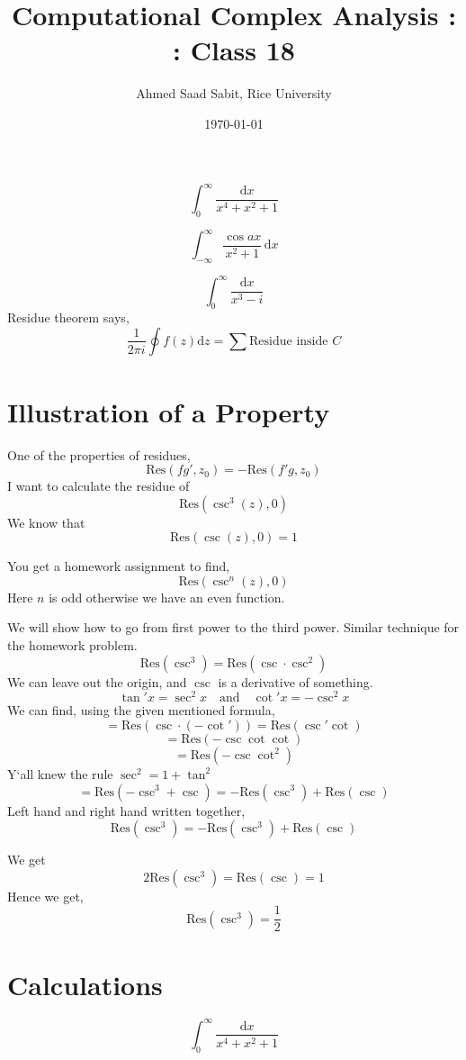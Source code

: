 \documentclass[letter]{article}
\title{Computational Complex Analysis : : Class 18}
\author{Ahmed Saad Sabit, Rice University}
\date{\today}
\begin{document}
\maketitle
\[
\int_0^{\infty} \frac{\mathrm{d} x}{x^{4}+x^2+1}
\] 

\[
	\int_{-\infty}^{\infty} \frac{\cos a x}{x^2 + 1} \, \mathrm{d} x
\]

\[
\int_0^{\infty} \frac{\mathrm{d} x}{x^3 - i }
\] 
Residue theorem says, 
\[
\frac{1}{2 \pi i} \oint f(z) \mathrm{d} z = 
\sum_{}^{} \text{Residue inside } C
\] 

\section*{Illustration of a Property} 
One of the properties of residues,
\[
\text{Res}\left(fg' , z_0\right) = - \text{Res}(f'g, z_0)
\] 
I want to calculate the residue of 
\[
\text{Res} \left(\csc^3(z) , 0\right)
\]
We know that 
\[
\text{Res}\left(\csc (z) , 0 \right) = 1
\]

You get a homework assignment to find, 
\[
\text{Res} \left(\csc^{n}(z) , 0\right)
\] Here $n$ is odd otherwise we have an even function.

We will show how to go from first power to the third power. Similar technique for the homework problem. 
\[
\text{Res}\left(\csc^3\right) = \text{Res} \left(\csc \cdot \csc ^2\right)
\] We can leave out the origin, and $\csc $ is a derivative of something.
\[
\tan ' x = \sec ^2  x \quad \text{and} \quad \cot ' x = - \csc ^2 x 
\]
We can find, using the given mentioned formula, 
\[
 = \text{Res} \left(\csc \cdot \left(- \cot ' \right)\right) = \text{Res} \left(\csc ' \cot \right)
\]
\[
= \text{Res} \left(- \csc \cot \cot \right)
\]
\[
= \text{Res}\left(- \csc \cot ^2\right)
\]
Y`all knew the rule $\sec ^2 = 1 + \tan ^2 $
\[
= \text{Res}\left(- \csc ^3 + \csc \right) = - \text{Res}\left(\csc ^3\right) + \text{Res} \left(\csc\right)
\]
Left hand and right hand written together,
\[
\text{Res}\left(\csc ^3\right) = 
- \text{Res}\left(\csc ^3\right) + \text{Res} \left(\csc\right)
\]

We get 
\[
	2 \text{Res}\left(\csc ^3\right) = \text{Res}(\csc) = 1
\] 
Hence we get,
\[
\boxed{
\text{Res} \left(\csc ^3\right) = \frac{1}{2}
}
\] 
\section*{Calculations} 
\[
\int_0^{\infty} \frac{\mathrm{d} x}{x^{4}+x^2+1}
\] 
\end{document}
